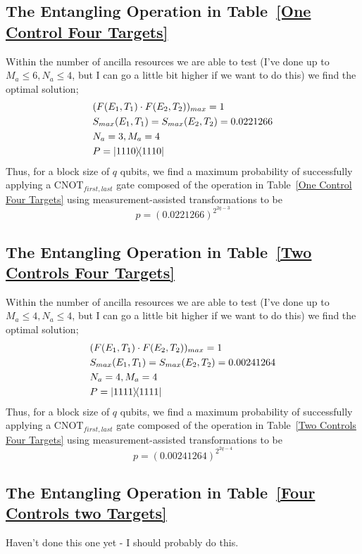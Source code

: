 \documentclass[aps,pra,twocolumn,showpacs,superscriptaddress,floatfix,10pt]{revtex4}
\begin{document}
\subsection{The Entangling Operation in Table~\ref{One Control Four Targets}}
Within the number of ancilla resources we are able to test (I've done up to $M_a \le 6,N_a \le 4$, but I can go a little bit higher if we want to do this) we find the optimal solution;
\begin{eqnarray}
& (F(E_1,T_1) \cdot F(E_2,T_2))_{max} = 1 \nonumber \\
& S_{max}(E_1,T_1) = S_{max}(E_2,T_2) = 0.0221266 \\
& N_a = 3,M_a=4 \nonumber \\
& P = \outerproduct{1110}{1110} \nonumber	
\end{eqnarray}
Thus, for a block size of $q$ qubits, we find a maximum probability of successfully applying a $\mbox{CNOT}_{first,last}$ gate composed of the operation in Table~\ref{One Control Four Targets} using measurement-assisted transformations to be
\begin{equation}
\label{1C4T Result}
p = (0.0221266)^{2^{2q-3}}
\end{equation}
\subsection{The Entangling Operation in Table~\ref{Two Controls Four Targets}}
 Within the number of ancilla resources we are able to test (I've done up to $M_a \le 4,N_a \le 4$, but I can go a little bit higher if we want to do this) we find the optimal solution;
 \begin{eqnarray}
 & (F(E_1,T_1) \cdot F(E_2,T_2))_{max} = 1 \nonumber\\
 & S_{max}(E_1,T_1) = S_{max}(E_2,T_2) = 0.00241264 \\
 & N_a = 4,M_a=4 \nonumber\\
 & P = \outerproduct{1111}{1111} \nonumber	
 \end{eqnarray}
 Thus, for a block size of $q$ qubits, we find a maximum probability of successfully applying a $\mbox{CNOT}_{first,last}$ gate composed of the operation in Table~\ref{Two Controls Four Targets} using measurement-assisted transformations to be
 \begin{equation}
 \label{2C4T Result}
 p = (0.00241264)^{2^{2q-4}}
 \end{equation}
 \subsection{The Entangling Operation in Table~\ref{Four Controls two Targets}}
 Haven't done this one yet - I should probably do this.
\end{document}
